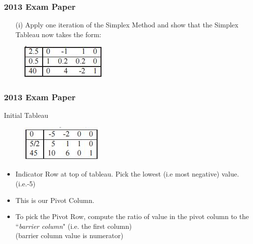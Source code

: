 \documentclass{beamer}
\begin{document}
\begin{frame}
\frametitle{2013 Exam Paper}
\large
\begin{itemize}
\item[(i)] Apply one iteration of the Simplex Method and show that the Simplex
Tableau now takes the form: 
\end{itemize}

\begin{figure}
\centering
\includegraphics[width=0.7\linewidth]{exam13-a}

\end{figure}

\end{frame}
\begin{frame}
\frametitle{2013 Exam Paper}
\large
Initial Tableau
\begin{figure}
\centering
\includegraphics[width=0.4\linewidth]{exam13-0a}
\end{figure}

\begin{itemize}
\item Indicator Row at top of tableau. Pick the lowest (i.e most negative)  value. (i.e.-5)
\item This is our Pivot Column.
\item To pick the Pivot Row, compute the ratio of value in the pivot column to the ``\textit{barrier column}" (i.e. the first column) \\ (barrier column value is numerator)

\end{itemize}	


\end{frame}
\end{document}
